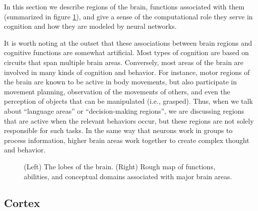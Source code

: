 In this section we describe regions of the brain, functions associated with them (summarized in figure \ref{brain_lobes}), and give a sense of the computational role they serve in cognition and how they are modeled by neural networks.

It is worth noting at the outset that these associations between brain regions and cognitive functions are somewhat artificial. Most types of cognition are based on circuits that span multiple brain areas. Conversely, most areas of the brain are involved in  many kinds of cognition and behavior. For instance, motor regions of the brain are known to be active in body movements, but  also participate in movement planning, observation of the movements of others, and even the perception of objects that can be manipulated (i.e., grasped). Thus, when we talk about ``language areas'' or ``decision-making regions'', we are discussing regions that are active when the relevant behaviors occur, but these regions are not solely responsible for such tasks. In the same way that neurons work in groups to process information, higher brain areas work together to create complex thought and behavior.

\begin{figure}[h]
\centering
{}
\hspace*{.2in}
\caption[Left: Pamela Payne; Right: Pamela Payne, using text taken from the Emergent Wiki.]{(Left) The lobes of the brain. (Right) Rough map of functions, abilities, and conceptual domains associated with major brain areas.}
\label{brain_lobes}
\end{figure}

\subsection{Cortex}

